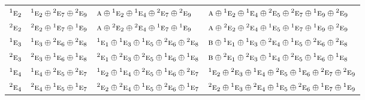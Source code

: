\documentclass[10pt,a4paper]{article}
\numberwithin{equation}{section}
\newcommand{\irr}[1]{\text{\normalfont\scshape #1}}
\newcommand{\conjpair}[1]{{}^{#1}}
\begin{document}
{\begin{longtable}{@{}llll@{}}
$\conjpair{1}\irr{e}_{2}$ & $\conjpair{1}\irr{e}_{2}\oplus \conjpair{2}\irr{e}_{7}\oplus \conjpair{2}\irr{e}_{9}$ & $\irr{a}\oplus \conjpair{1}\irr{e}_{2}\oplus \conjpair{1}\irr{e}_{4}\oplus \conjpair{2}\irr{e}_{7}\oplus \conjpair{2}\irr{e}_{9}$ & $\irr{a}\oplus \conjpair{1}\irr{e}_{2}\oplus \conjpair{1}\irr{e}_{4}\oplus \conjpair{2}\irr{e}_{5}\oplus \conjpair{2}\irr{e}_{7}\oplus \conjpair{1}\irr{e}_{9}\oplus \conjpair{2}\irr{e}_{9}$\\
$\conjpair{2}\irr{e}_{2}$ & $\conjpair{2}\irr{e}_{2}\oplus \conjpair{1}\irr{e}_{7}\oplus \conjpair{1}\irr{e}_{9}$ & $\irr{a}\oplus \conjpair{2}\irr{e}_{2}\oplus \conjpair{2}\irr{e}_{4}\oplus \conjpair{1}\irr{e}_{7}\oplus \conjpair{1}\irr{e}_{9}$ & $\irr{a}\oplus \conjpair{2}\irr{e}_{2}\oplus \conjpair{2}\irr{e}_{4}\oplus \conjpair{1}\irr{e}_{5}\oplus \conjpair{1}\irr{e}_{7}\oplus \conjpair{1}\irr{e}_{9}\oplus \conjpair{2}\irr{e}_{9}$\\
$\conjpair{1}\irr{e}_{3}$ & $\conjpair{1}\irr{e}_{3}\oplus \conjpair{2}\irr{e}_{6}\oplus \conjpair{2}\irr{e}_{8}$ & $\conjpair{1}\irr{e}_{1}\oplus \conjpair{1}\irr{e}_{3}\oplus \conjpair{1}\irr{e}_{5}\oplus \conjpair{2}\irr{e}_{6}\oplus \conjpair{2}\irr{e}_{8}$ & $\irr{b}\oplus \conjpair{1}\irr{e}_{1}\oplus \conjpair{1}\irr{e}_{3}\oplus \conjpair{2}\irr{e}_{4}\oplus \conjpair{1}\irr{e}_{5}\oplus \conjpair{2}\irr{e}_{6}\oplus \conjpair{2}\irr{e}_{8}$\\
$\conjpair{2}\irr{e}_{3}$ & $\conjpair{2}\irr{e}_{3}\oplus \conjpair{1}\irr{e}_{6}\oplus \conjpair{1}\irr{e}_{8}$ & $\conjpair{2}\irr{e}_{1}\oplus \conjpair{2}\irr{e}_{3}\oplus \conjpair{2}\irr{e}_{5}\oplus \conjpair{1}\irr{e}_{6}\oplus \conjpair{1}\irr{e}_{8}$ & $\irr{b}\oplus \conjpair{2}\irr{e}_{1}\oplus \conjpair{2}\irr{e}_{3}\oplus \conjpair{1}\irr{e}_{4}\oplus \conjpair{2}\irr{e}_{5}\oplus \conjpair{1}\irr{e}_{6}\oplus \conjpair{1}\irr{e}_{8}$\\
$\conjpair{1}\irr{e}_{4}$ & $\conjpair{1}\irr{e}_{4}\oplus \conjpair{2}\irr{e}_{5}\oplus \conjpair{2}\irr{e}_{7}$ & $\conjpair{1}\irr{e}_{2}\oplus \conjpair{1}\irr{e}_{4}\oplus \conjpair{2}\irr{e}_{5}\oplus \conjpair{1}\irr{e}_{6}\oplus \conjpair{2}\irr{e}_{7}$ & $\conjpair{1}\irr{e}_{2}\oplus \conjpair{2}\irr{e}_{3}\oplus \conjpair{1}\irr{e}_{4}\oplus \conjpair{2}\irr{e}_{5}\oplus \conjpair{1}\irr{e}_{6}\oplus \conjpair{2}\irr{e}_{7}\oplus \conjpair{2}\irr{e}_{9}$\\
$\conjpair{2}\irr{e}_{4}$ & $\conjpair{2}\irr{e}_{4}\oplus \conjpair{1}\irr{e}_{5}\oplus \conjpair{1}\irr{e}_{7}$ & $\conjpair{2}\irr{e}_{2}\oplus \conjpair{2}\irr{e}_{4}\oplus \conjpair{1}\irr{e}_{5}\oplus \conjpair{2}\irr{e}_{6}\oplus \conjpair{1}\irr{e}_{7}$ & $\conjpair{2}\irr{e}_{2}\oplus \conjpair{1}\irr{e}_{3}\oplus \conjpair{2}\irr{e}_{4}\oplus \conjpair{1}\irr{e}_{5}\oplus \conjpair{2}\irr{e}_{6}\oplus \conjpair{1}\irr{e}_{7}\oplus \conjpair{1}\irr{e}_{9}$\\

\end{longtable}}
\end{document}
